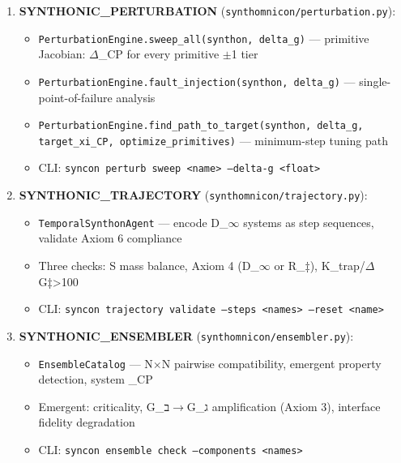 \documentclass[12pt,a4paper]{article}
\begin{document}
\begin{enumerate}
    \item 
    \textbf{SYNTHONIC\_PERTURBATION} (\texttt{synthomnicon/perturbation.py}):

    \begin{itemize}
    \item \texttt{PerturbationEngine.sweep\_all(synthon, delta\_g)} --- primitive Jacobian: $\Delta$\xi\_CP for every primitive $\pm$1 tier
    \item \texttt{PerturbationEngine.fault\_injection(synthon, delta\_g)} --- single-point-of-failure analysis
    \item \texttt{PerturbationEngine.find\_path\_to\_target(synthon, delta\_g, target\_xi\_CP, optimize\_primitives)} --- minimum-step tuning path
    \item CLI: \texttt{syncon perturb sweep \textless{}name\textgreater{} --delta-g \textless{}float\textgreater{}}
\end{itemize}

    \item 
    \textbf{SYNTHONIC\_TRAJECTORY} (\texttt{synthomnicon/trajectory.py}):

    \begin{itemize}
    \item \texttt{TemporalSynthonAgent} --- encode D\_$\infty$ systems as step sequences, validate Axiom 6 compliance
    \item Three checks: S mass balance, Axiom 4 (D\_$\infty$ or R\_‡), K\_trap/$\Delta$G‡\textgreater{}100
    \item CLI: \texttt{syncon trajectory validate --steps \textless{}names\textgreater{} --reset \textless{}name\textgreater{}}
\end{itemize}

    \item 
    \textbf{SYNTHONIC\_ENSEMBLER} (\texttt{synthomnicon/ensembler.py}):

    \begin{itemize}
    \item \texttt{EnsembleCatalog} --- N$\times$N pairwise compatibility, emergent property detection, system \xi\_CP
    \item Emergent: criticality, G\_ב$\rightarrow$G\_ג amplification (Axiom 3), interface fidelity degradation
    \item CLI: \texttt{syncon ensemble check --components \textless{}names\textgreater{}}
\end{itemize}


\end{enumerate}
\end{document}

